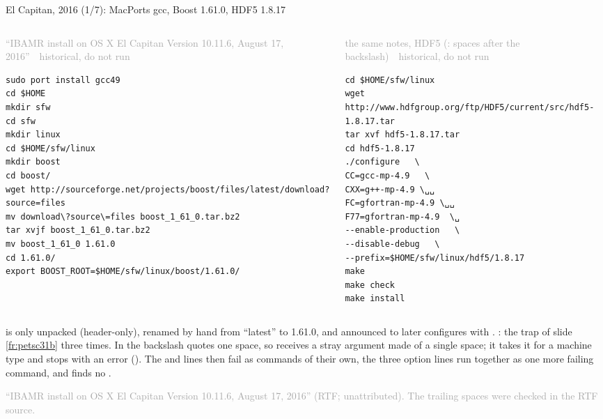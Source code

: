 \documentclass[aspectratio=169,11pt]{beamer}
\newcommand{\sourcecredit}[1]{\vfill\begin{flushright}\tiny\textcolor{DarkGray}{#1}\end{flushright}}
\newcommand{\hist}[1]{{\tiny\sffamily\textcolor{DarkGray}{#1\ \textbullet\ historical, do not run}}\par\nointerlineskip\vspace{0.3mm}}
\begin{document}
\begin{frame}[fragile]{El Capitan, 2016 (1/7): MacPorts gcc, Boost 1.61.0, HDF5 1.8.17}
\label{fr:ec1}
\begin{columns}[T,onlytextwidth]
\begin{column}{0.48\textwidth}
\hist{``IBAMR install on OS X El Capitan Version 10.11.6, August 17, 2016''}
\begin{lstlisting}[style=hist]
sudo port install gcc49
cd $HOME
mkdir sfw
cd sfw
mkdir linux
cd $HOME/sfw/linux
mkdir boost
cd boost/
wget http://sourceforge.net/projects/boost/files/latest/download?source=files
mv download\?source\=files boost_1_61_0.tar.bz2
tar xvjf boost_1_61_0.tar.bz2
mv boost_1_61_0 1.61.0
cd 1.61.0/
export BOOST_ROOT=$HOME/sfw/linux/boost/1.61.0/
\end{lstlisting}
\end{column}
\begin{column}{0.49\textwidth}
\hist{the same notes, HDF5 (\textvisiblespace: spaces after the backslash)}
\begin{lstlisting}[style=hist]
cd $HOME/sfw/linux
wget http://www.hdfgroup.org/ftp/HDF5/current/src/hdf5-1.8.17.tar
tar xvf hdf5-1.8.17.tar
cd hdf5-1.8.17
./configure   \
CC=gcc-mp-4.9   \
CXX=g++-mp-4.9 \␣␣
FC=gfortran-mp-4.9 \␣␣
F77=gfortran-mp-4.9  \␣
--enable-production   \
--disable-debug   \
--prefix=$HOME/sfw/linux/hdf5/1.8.17
make
make check
make install
\end{lstlisting}
\end{column}
\end{columns}
\vspace{1mm}
\scriptsize {} is only unpacked (header-only), renamed by hand from ``latest'' to 1.61.0, and announced to later configures with . : the trap of slide \ref{fr:petsc31b} three times. In  the backslash quotes one space, so  receives a stray argument made of a single space; it takes it for a machine type and stops with an error (). The  and  lines then fail as commands of their own, the three option lines run together as one more failing command, and  finds no .
\sourcecredit{``IBAMR install on OS X El Capitan Version 10.11.6, August 17, 2016'' (RTF; unattributed). The trailing spaces were checked in the RTF source.}
\end{frame}
\end{document}
